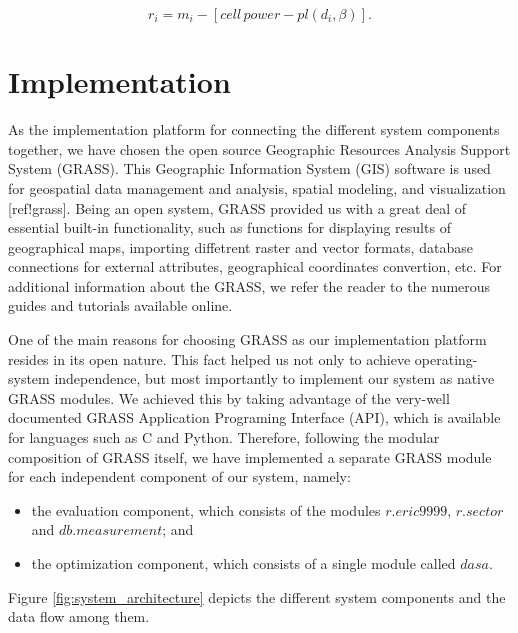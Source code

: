 \begin{equation}
r_{i}=m_{i}-\left[cell\, power-pl(d_{i},\beta)\right].\label{eq:residual}
\end{equation}



\section{Implementation}

As the implementation platform for connecting the different system
components together, we have chosen the open source Geographic Resources
Analysis Support System (GRASS). This Geographic Information System
(GIS) software is used for geospatial data management and analysis,
spatial modeling, and visualization {[}ref!grass{]}. Being an open
system, GRASS provided us with a great deal of essential built-in
functionality, such as functions for displaying results of geographical
maps, importing diffetrent raster and vector formats, database connections
for external attributes, geographical coordinates convertion, etc.
For additional information about the GRASS, we refer the reader to
the numerous guides and tutorials available online.

One of the main reasons for choosing GRASS as our implementation platform
resides in its open nature. This fact helped us not only to achieve
operating-system independence, but most importantly to implement our
system as native GRASS modules. We achieved this by taking advantage
of the very-well documented GRASS Application Programing Interface
(API), which is available for languages such as C and Python. Therefore,
following the modular composition of GRASS itself, we have implemented
a separate GRASS module for each independent component of our system,
namely:
\begin{itemize}
\item the evaluation component, which consists of the modules $r.eric9999$,
$r.sector$ and $db.measurement$; and
\item the optimization component, which consists of a single module called
$dasa$.
\end{itemize}
Figure \ref{fig:system_architecture} depicts the different system
components and the data flow among them.

